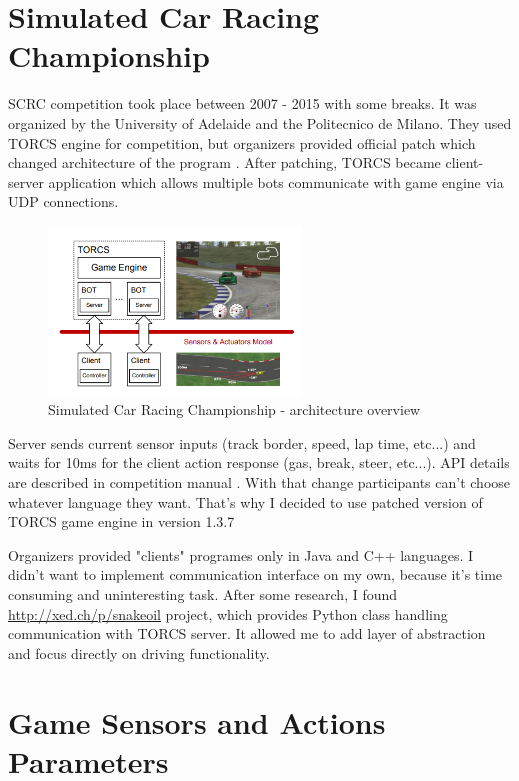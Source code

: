 \documentclass[declaration,shortabstract,english,inz]{iithesis}
\begin{document}
\section{Simulated Car Racing Championship}

SCRC competition took place between 2007 - 2015 with some breaks. It was organized by the University of Adelaide and the Politecnico de Milano.
They used TORCS engine for competition, but organizers provided official patch which changed architecture of the program \cite{SCRC}.
After patching, TORCS became client-server application which allows multiple bots communicate with game engine via UDP connections. 

\begin{figure}
    \includegraphics[width=0.6\textwidth]{img/scr_architecture.png}
    \caption{Simulated Car Racing Championship - architecture overview \cite{scrc_manual}}
    \label{fig:scrc_arc}
\end{figure}

Server sends current sensor inputs (track border, speed, lap time, etc...) and waits for 10ms for the client action response (gas, break, steer, etc...).
 API details are described in competition manual \cite{scrc_manual}.
 With that change participants can't choose whatever language they want.
 That's why I decided to use patched version of TORCS game engine in version 1.3.7

Organizers provided "clients" programes only in Java and C++ languages.
I didn't want to implement communication interface on my own, because it's time consuming  and uninteresting task.
After some research, I found \url{http://xed.ch/p/snakeoil} project, which provides Python class handling communication with TORCS server.
It allowed me to add layer of abstraction and focus directly on driving functionality.

\section{Game Sensors and Actions Parameters}
    
\end{document}
